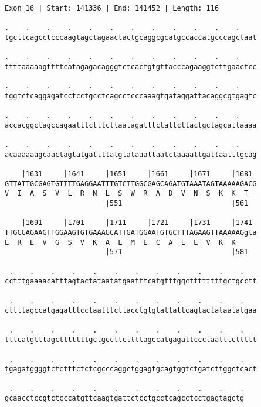\documentclass{article}
\begin{document}
\begin{Verbatim}[fontfamily=courier]
Exon 16 | Start: 141336 | End: 141452 | Length: 116

.    .    .    .    .    .    .    .    .    .    .    .    
tgcttcagcctcccaagtagctagaactactgcaggcgcatgccaccatgcccagctaat

.    .    .    .    .    .    .    .    .    .    .    .    
ttttaaaaagttttcatagagacagggtctcactgtgttacccagaaggtcttgaactcc

.    .    .    .    .    .    .    .    .    .    .    .    
tggtctcaggagatcctcctgcctcagcctcccaaagtgataggattacaggcgtgagtc

.    .    .    .    .    .    .    .    .    .    .    .    
accacggctagccagaatttctttcttaatagatttctattcttactgctagcattaaaa

.    .    .    .    .    .    .    .    .    .    .    .    
acaaaaaagcaactagtatgattttatgtataaattaatctaaaattgattaatttgcag

    |1631     |1641     |1651     |1661     |1671     |1681 
GTTATTGCGAGTGTTTTGAGGAATTTGTCTTGGCGAGCAGATGTAAATAGTAAAAAGACG
V  I  A  S  V  L  R  N  L  S  W  R  A  D  V  N  S  K  K  T  
                        |551                          |561  

    |1691     |1701     |1711     |1721     |1731     |1741 
TTGCGAGAAGTTGGAAGTGTGAAAGCATTGATGGAATGTGCTTTAGAAGTTAAAAAGgta
L  R  E  V  G  S  V  K  A  L  M  E  C  A  L  E  V  K  K     
                        |571                          |581  

 .    .    .    .    .    .    .    .    .    .    .    .   
cctttgaaaacatttagtactataatatgaatttcatgtttggcttttttttgctgcctt

 .    .    .    .    .    .    .    .    .    .    .    .   
cttttagccatgagatttcctaatttcttacctgtgtattattcagtactataatatgaa

 .    .    .    .    .    .    .    .    .    .    .    .   
tttcatgtttagctttttttgctgccttcttttagccatgagattccctaatttcttttt

 .    .    .    .    .    .    .    .    .    .    .    .   
tgagatggggtctctttctctcgcccaggctggagtgcagtggtctgatcttggctcact

 .    .    .    .    .    .    .    .    .    .    .    .
gcaacctccgtctcccatgttcaagtgattctcctgcctcagcctcctgagtagctg
\end{Verbatim}
\newpage
\end{document}
